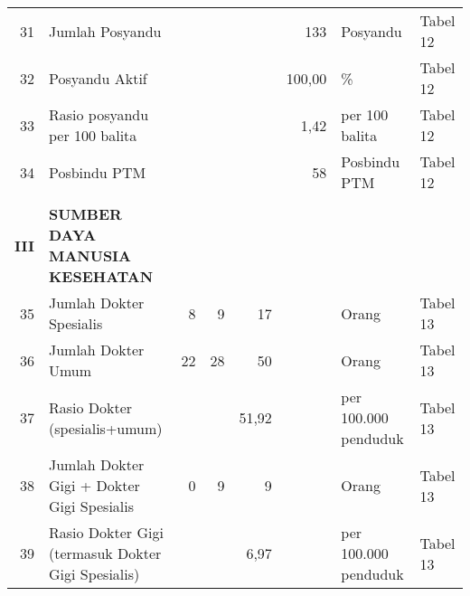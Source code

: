 \begin{small}
\begin{longtable}{rY{12em}rrrrY{5em}Y{5em}}
	                   31 & Jumlah Posyandu                                                                       &        &        &         &               133 & Posyandu                       & Tabel 12 \\
	 32 & Posyandu Aktif                                                                        &        &        &         &            100,00 & \%                             & Tabel 12 \\
	                   33 & Rasio posyandu per 100 balita                                                         &        &        &         &              1,42 & per 100 balita                 & Tabel 12 \\
	 34 & Posbindu PTM                                                                          &        &        &         &                58 & Posbindu PTM                   & Tabel 12 \\
	                      &                                                                                       &        &        &         &                   &                                &          \\
	         \textbf{III} & \textbf{SUMBER DAYA MANUSIA KESEHATAN}                                                &        &        &         &                   &                                &          \\
	                   35 & Jumlah Dokter Spesialis                                                               &      8 &      9 &      17 &                   & Orang                          & Tabel 13 \\
	 36 & Jumlah Dokter Umum                                                                    &     22 &     28 &      50 &                   & Orang                          & Tabel 13 \\
	                   37 & Rasio Dokter (spesialis+umum)                                                         &        &        &   51,92 &                   & per 100.000 penduduk           & Tabel 13 \\
	 38 & Jumlah Dokter Gigi + Dokter Gigi Spesialis                                            &      0 &      9 &       9 &                   & Orang                          & Tabel 13 \\
	                   39 & Rasio Dokter Gigi (termasuk Dokter Gigi Spesialis)                                    &        &        &    6,97 &                   & per 100.000 penduduk           & Tabel 13 \\

\end{longtable}
\end{small}
